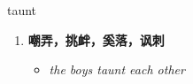 
\begin{frame}
{\huge taunt}
\begin{center}
\begin{enumerate}\Large
  \item \textbf{嘲弄，挑衅，奚落，讽刺}
  \begin{itemize}
    \item \em{\Large{the boys taunt each other}}
  \end{itemize}
\end{enumerate}
\end{center}
\end{frame}
